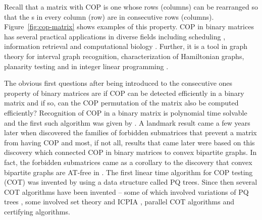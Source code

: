 \documentclass[MS,synopsis]{iitmdiss}
\begin{document}
Recall that a matrix with COP is one whose rows (columns)
can be rearranged so that the {\un}s in every column (row) are in
consecutive rows (columns). Figure~\ref{fig:cop-matrix} shows examples
of this property.
COP in binary matrices has several practical applications in diverse
fields including scheduling \cite{hl06}, information retrieval
\cite{k77} and computational biology \cite{abh98}.  Further, it is a
tool in graph theory \cite{mcg04} for interval graph recognition,
characterization of Hamiltonian graphs, planarity testing \cite{bl76}
and in integer linear programming \cite{ht02,hl06}.


The obvious first questions after being introduced to the consecutive
ones property of binary matrices are if COP can be detected
efficiently in a binary matrix and if so, can the COP permutation of
the matrix also be computed efficiently?  Recognition of COP in a
binary matrix is polynomial time solvable and the first such algorithm
was given by \cite{fg65}.  A landmark result came a few years later
when \cite{at72} discovered the families of forbidden submatrices that
prevent a matrix from having COP and most, if not all, results that
came later were based on this discovery which connected COP in binary
matrices to convex bipartite graphs. In fact, the forbidden
submatrices came as a corollary to the discovery that convex bipartite
graphs are AT-free in \cite{at72}. The first linear time
algorithm for COP testing (COT) was invented by \cite{bl76} using a
data structure called PQ trees.  Since then several COT algorithms
have been invented -- some of which involved variations of PQ trees
\cite{mm96,wlh01,mcc04}, some involved set theory and ICPIA
\cite{wlh02,nsnrs09}, parallel COT algorithms\cite{as95,bs03,ly91} and
certifying algorithms\cite{mcc04}. %
\end{document}
